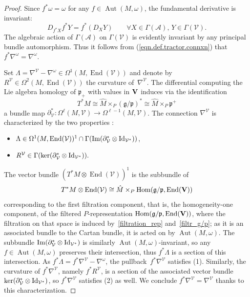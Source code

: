 \documentclass[10pt,a4paper]{amsart}
\numberwithin{equation}{section}
\theoremstyle{definition}
\def\V{{\bf V}}
\newcommand{\cV}{{\mathcal V}}
\def\g{{\mathfrak g}}
\def\p{{\mathfrak p}}
\newcommand{\Aut}{\operatorname{Aut}}
\begin{document}
\begin{proof}
Since $f^*\omega=\omega$ for any $f \in \Aut(M,\omega)$, the fundamental derivative is invariant:
\[D_{f^* X} f^* Y = f^* (D_X Y) \qquad \forall X \in \Gamma({\mathcal{A}}), \, Y \in \Gamma(\mathcal{V}).\]
The algebraic action of $\Gamma(\mathcal{A})$ on $\Gamma(\mathcal{V})$ is evidently invariant by any principal bundle automorphism.
Thus it follows from (\ref{eqn.def.tractor.connxn}) that $f^*\nabla^\omega=\nabla^{\omega}$.

Set $\Lambda=\nabla^{\cV}-\nabla^{\omega}\in\Omega^1(M, \operatorname{End}(\cV))$ and denote by $R^{\cV}\in\Omega^2(M, \operatorname{End}(\cV))$ the curvature of~$\nabla^{\cV}$. The differential computing the Lie algebra homology of $\p_+$ with values in $\V$ induces via the identification
\[T^*M \cong \hat{M} \times_P (\g / \p)^* \cong \hat{M} \times_P \p^+\]
 a bundle map
$\partial^*_{\cV}\colon \Omega^\ell(M, \cV)\rightarrow \Omega^{\ell-1}(M, \cV)$. The connection $\nabla^{\cV}$ is characterized by the two properties \cite{hsss.prol.connxn}:
\begin{itemize}\itemsep=0pt
\item[(1)] $\Lambda\in\Omega^1(M, \operatorname{End}(\cV))^1\cap \Gamma(\operatorname{Im}(\partial^*_{\cV}\otimes {\rm Id}_{\cV^*}))$,
\item[(2)] $R^{{\cV}}\in\Gamma(\ker(\partial^*_{\cV}\otimes {\rm Id}_{\cV^*})).$
\end{itemize}
The vector bundle $(T^*M\otimes\operatorname{End}(\cV))^1$ is the subbundle of
\[
T^*M\otimes\operatorname{End}(\cV)\cong \hat M\times_P\operatorname{Hom}(\g/\p,\operatorname{End}({\bf V}))
\]
 corresponding to the first filtration component, that is, the homogeneity-one component, of the filtered $P$-representation
$\operatorname{Hom}(\g/\p,\operatorname{End}({\bf V}))$, where the filtration on that space is induced by~\eqref{filtration_rep} and~\eqref{filtr_g/p}; as it is an associated bundle to the Cartan bundle, it is acted on by $\Aut(M,\omega)$. The subbundle $\operatorname{Im}(\partial^*_{\cV}\otimes {\rm Id}_{\cV^*})$ is similarly $\Aut(M,\omega)$-invariant, so any $f \in \Aut(M,\omega)$ preserves their intersection, thus $f^*\Lambda$
is a section of this intersection. As $f^*\Lambda = f^*\nabla^\cV-\nabla^{\omega}$, the pullback~$f^* \nabla^\cV$ satisfies (1).
Similarly, the curvature of $f^*\nabla^\cV$, namely $f^*R^{{\cV}}$, is a section of the associated vector bundle $\ker(\partial^*_{\cV}\otimes {\rm Id}_{\cV^*})$, so $f^* \nabla^\cV$ satisfies (2) as well.
We conclude $f^*\nabla^{\cV}=\nabla^{\cV}$ thanks to this characterization.
\end{proof}
\end{document}
